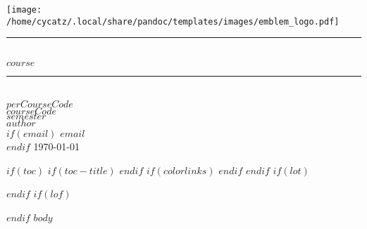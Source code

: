 \documentclass[
$if(fontsize)$
  $fontsize$,
$endif$
$if(lang)$
  $babel-lang$,
$endif$
$if(papersize)$
  $papersize$paper,
$endif$
$if(handout)$
  handout,
$endif$
$if(aspectratio)$
  aspectratio=$aspectratio$,
$endif$
$for(classoption)$
  $classoption$$sep$,
$endfor$
]{$documentclass$}
\makeatletter
\def\maxwidth{\ifdim\Gin@nat@width>\linewidth\linewidth
\else\Gin@nat@width\fi}
\let\Oldincludegraphics\includegraphics
\renewcommand{\includegraphics}[1]{\Oldincludegraphics[width=\maxwidth]{#1}}
\makeatother
\begin{document}
	\begin{titlepage}
		\centering
		\vspace*{0.2cm}
		\texttt{[image: /home/cycatz/.local/share/pandoc/templates/images/emblem\_logo.pdf]}\\[0.6cm]
		\rule{\linewidth}{0.2 mm} \\[0.4 cm]
		{\huge $course$}\\
		\rule{\linewidth}{0.3 mm} \\[1.5 cm]
		\textsc{\Large $perCourseCode$}\\[0.5 cm]				%
		\textsc{\large $courseCode$}\\[0.5 cm]				%
		\textsc{\large $semester$}\\[0.5 cm]				%
		\vspace*{\fill}
		\large{$author$}\\
		$if(email)$
		\large{$email$}\\
		$endif$
		\large{\today}
	\end{titlepage}

$if(toc)$
	$if(toc-title)$
		\renewcommand*\contentsname{$toc-title$}
	$endif$
	$if(colorlinks)$
		\hypersetup{linkcolor=$if(toccolor)$$toccolor$$else$$endif$}
	$endif$
	\setcounter{tocdepth}{$toc-depth$}
	\tableofcontents
$endif$
$if(lot)$
	\listoftables
$endif$
$if(lof)$
	\listoffigures
$endif$
$body$
\end{document}
